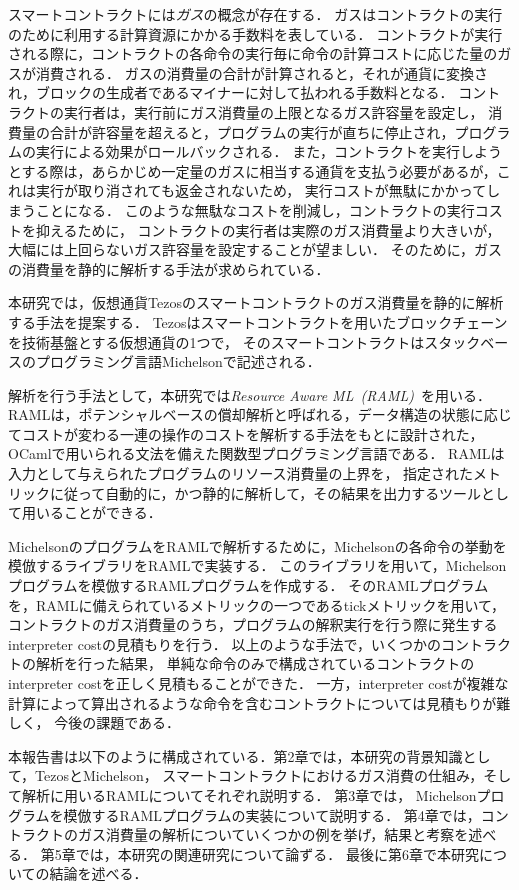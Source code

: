 \documentclass{kuisthesis}
\begin{document}
スマートコントラクトには\emph{ガス}の概念が存在する\cite{tezos}．
ガスはコントラクトの実行のために利用する計算資源にかかる手数料を表している．
コントラクトが実行される際に，コントラクトの各命令の実行毎に命令の計算コストに応じた量のガスが消費される．
ガスの消費量の合計が計算されると，それが通貨に変換され，ブロックの生成者であるマイナーに対して払われる手数料となる．
コントラクトの実行者は，実行前にガス消費量の上限となるガス許容量を設定し，
消費量の合計が許容量を超えると，プログラムの実行が直ちに停止され，プログラムの実行による効果がロールバックされる．
また，コントラクトを実行しようとする際は，あらかじめ一定量のガスに相当する通貨を支払う必要があるが，これは実行が取り消されても返金されないため，
実行コストが無駄にかかってしまうことになる．
このような無駄なコストを削減し，コントラクトの実行コストを抑えるために，
コントラクトの実行者は実際のガス消費量より大きいが，大幅には上回らないガス許容量を設定することが望ましい．
そのために，ガスの消費量を静的に解析する手法が求められている．

本研究では，仮想通貨Tezosのスマートコントラクトのガス消費量を静的に解析する手法を提案する．
Tezosはスマートコントラクトを用いたブロックチェーンを技術基盤とする仮想通貨の1つで，
そのスマートコントラクトはスタックベースのプログラミング言語Michelsonで記述される．

解析を行う手法として，本研究では\emph{Resource Aware ML\ (RAML)}\ \cite{raml}を用いる．
RAMLは，ポテンシャルベースの償却解析と呼ばれる，データ構造の状態に応じてコストが変わる一連の操作のコストを解析する手法をもとに設計された\cite{amortized}，
OCamlで用いられる文法を備えた関数型プログラミング言語である．
RAMLは入力として与えられたプログラムのリソース消費量の上界を，
指定されたメトリックに従って自動的に，かつ静的に解析して，その結果を出力するツールとして用いることができる．

MichelsonのプログラムをRAMLで解析するために，Michelsonの各命令の挙動を模倣するライブラリをRAMLで実装する．
このライブラリを用いて，Michelsonプログラムを模倣するRAMLプログラムを作成する．
そのRAMLプログラムを，RAMLに備えられているメトリックの一つであるtickメトリックを用いて，
コントラクトのガス消費量のうち，プログラムの解釈実行を行う際に発生するinterpreter costの見積もりを行う．
以上のような手法で，いくつかのコントラクトの解析を行った結果，
単純な命令のみで構成されているコントラクトのinterpreter costを正しく見積もることができた．
一方，interpreter costが複雑な計算によって算出されるような命令を含むコントラクトについては見積もりが難しく，
今後の課題である．

本報告書は以下のように構成されている．第2章では，本研究の背景知識として，TezosとMichelson，
スマートコントラクトにおけるガス消費の仕組み，そして解析に用いるRAMLについてそれぞれ説明する．
第3章では， Michelsonプログラムを模倣するRAMLプログラムの実装について説明する．
第4章では，コントラクトのガス消費量の解析についていくつかの例を挙げ，結果と考察を述べる．
第5章では，本研究の関連研究について論ずる．
最後に第6章で本研究についての結論を述べる．
\end{document}
